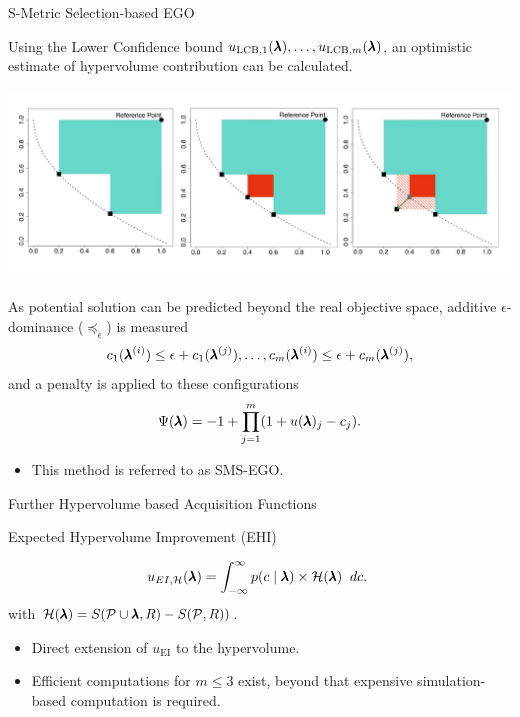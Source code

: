 \begin{frame}[allowframebreaks]{S-Metric Selection-based EGO}

    Using the Lower Confidence bound $u_{\text{LCB}, 1}(\pmb{\lambda}), \dots, u_{\text{LCB}, m}(\pmb{\lambda})$, an optimistic estimate of hypervolume contribution can be calculated.

    \begin{center}
        \includegraphics[scale=0.35]{images/hv_contribution_2}
    \end{center}

    \framebreak

    As potential solution can be predicted beyond the real objective space, additive $\epsilon$-dominance ($\preceq_\epsilon$) is measured
            $$
                c_1(\pmb{\lambda}^{(i)}) \le \epsilon+c_1(\pmb{\lambda}^{(j)}), \dots, c_m(\pmb{\lambda}^{(i)}) \le \epsilon+c_m(\pmb{\lambda}^{(j)}),
            $$
            and a penalty is applied to these configurations
            $$
                \Psi(\pmb{\lambda}) = -1 + \prod_{j=1}^m(1+u(\pmb{\lambda})_j - c_j).
            $$

    \begin{itemize}
        \item This method is referred to as SMS-EGO.
    \end{itemize}
\end{frame}

\begin{frame}{Further Hypervolume based Acquisition Functions}

    Expected Hypervolume Improvement (EHI)

$$
    u_{EI, \mathcal{H}}(\pmb{\lambda}) = \int_{-\infty}^{\infty} p(c \mid \pmb{\lambda}) \times \mathcal{H}(\pmb{\lambda})\;\; dc.\
$$
    with $\mathcal{H}(\pmb{\lambda}) = S(\mathcal{P} \cup \pmb{\lambda}, R) - S(\mathcal{P}, R))$.

    \begin{itemize}
        \item Direct extension of $u_\text{EI}$ to the hypervolume.
        \item Efficient computations for $m \le 3$ exist, beyond that expensive simulation-based computation is required.
    \end{itemize}

\end{frame}

